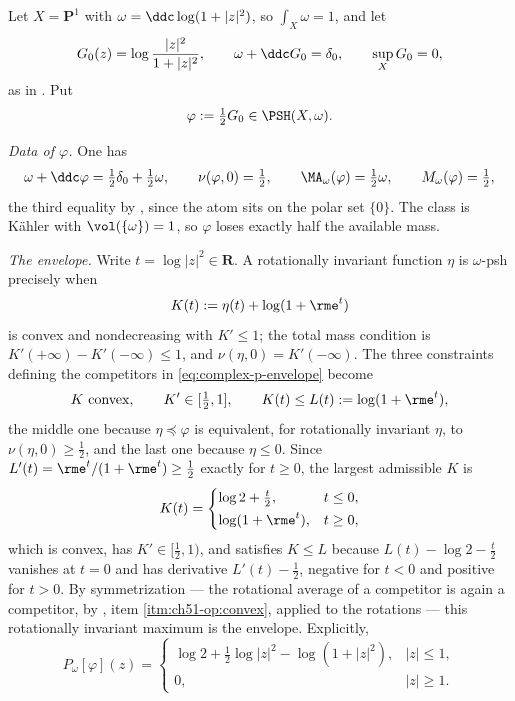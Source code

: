 \begin{example}
\label{ex:ch51-p1-envelope}
Let \(X=\mathbf P^1\) with \(\omega=\ddc\log(1+|z|^2)\), so
\(\int_X\omega=1\), and let
\[
 G_0(z)=\log\frac{|z|^2}{1+|z|^2},
 \qquad
 \omega+\ddc G_0=\delta_0,\qquad \sup_XG_0=0,
\]
as in .  Put
\[
 \varphi:=\tfrac12G_0\in\PSH(X,\omega).
\]

\emph{Data of \(\varphi\).}  One has
\[
 \omega+\ddc\varphi=\tfrac12\delta_0+\tfrac12\omega,
 \qquad
 \nu(\varphi,0)=\tfrac12,
 \qquad
 \MA_\omega(\varphi)=\tfrac12\omega,
 \qquad
 M_\omega(\varphi)=\tfrac12 ,
\]
the third equality by , since the atom
sits on the polar set \(\{0\}\).  The class is K\"ahler with
\(\vol(\{\omega\})=1\), so \(\varphi\) loses exactly half the available
mass.

\emph{The envelope.}  Write \(t=\log|z|^2\in\mathbf R\).  A rotationally
invariant function \(\eta\) is \(\omega\)-psh precisely when
\[
 K(t):=\eta(t)+\log(1+\rme^{t})
\]
is convex and nondecreasing with \(K'\leq1\); the total mass condition is
\(K'(+\infty)-K'(-\infty)\leq1\), and
\(\nu(\eta,0)=K'(-\infty)\).  The three constraints defining the
competitors in \eqref{eq:complex-p-envelope} become
\[
 K\ \text{convex},\qquad
 K'\in[\tfrac12,1],\qquad
 K(t)\leq L(t):=\log(1+\rme^{t}),
\]
the middle one because \(\eta\preceq\varphi\) is equivalent, for
rotationally invariant \(\eta\), to \(\nu(\eta,0)\geq\frac12\), and the
last one because \(\eta\leq0\).  Since \(L'(t)=\rme^t/(1+\rme^t)\geq
\frac12\) exactly for \(t\geq0\), the largest admissible \(K\) is
\[
 K(t)=
 \begin{cases}
 \log2+\tfrac t2, & t\leq0,\\[2pt]
 \log(1+\rme^t), & t\geq0,
 \end{cases}
\]
which is convex, has \(K'\in[\frac12,1)\), and satisfies \(K\leq L\)
because \(L(t)-\log2-\frac t2\) vanishes at \(t=0\) and has derivative
\(L'(t)-\frac12\), negative for \(t<0\) and positive for \(t>0\).  By
symmetrization --- the rotational average of a competitor is again a
competitor, by , item
\cref{itm:ch51-op:convex}, applied to the rotations --- this
rotationally invariant maximum is the envelope.  Explicitly,
\[
 P_\omega[\varphi](z)=
 \begin{cases}
 \log2+\tfrac12\log|z|^2-\log(1+|z|^2), & |z|\leq1,\\[3pt]
 0, & |z|\geq1 .
 \end{cases}
\]


\end{example}
